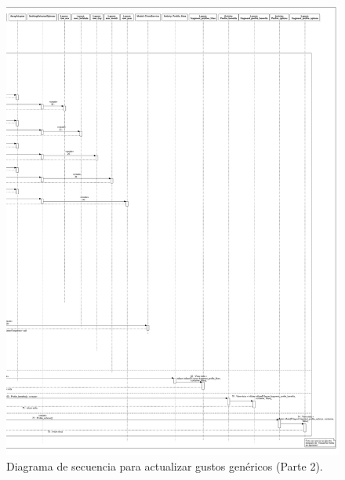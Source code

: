 \FloatBarrier
\begin{figure}[htbp!]
		\centering
			\includegraphics[width=.95 \textwidth]{imagenes/Diagramas_UserApp/Nuevos_diagramas/VerPerfil_2}
		\caption{Diagrama de secuencia para actualizar gustos genéricos (Parte 2).}
		\label{image:gustos3}
\end{figure}
\FloatBarrier

